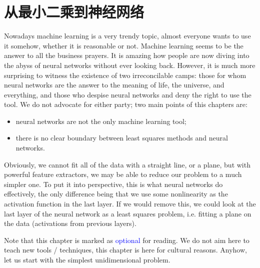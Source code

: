\documentclass[notitlepage,oneside]{book}
\begin{document}
\chapter{从最小二乘到神经网络}

Nowadays machine learning is a very trendy topic, almost everyone wants to use it somehow, whether it is reasonable or not.
Machine learning seems to be the answer to all the business prayers.
It is amazing how people are now diving into the abyss of neural networks without ever looking back.
However, it is much more surprising to witness the existence of two irreconcilable camps: those for whom neural networks are the answer
to the meaning of life, the universe, and everything, and those who despise neural networks and deny the right to use the tool.
We do not advocate for either party; two main points of this chapters are:
\begin{itemize}
\item neural networks are not the only machine learning tool;
\item there is no clear boundary between least squares methods and neural networks.
\end{itemize}

Obviously, we cannot fit all of the data with a straight line, or a plane, but with powerful feature extractors, we may be able to reduce our problem to a much simpler one.
To put it into perspective, this is what neural networks do effectively, the only difference being that we use some nonlinearity as the activation function in the last layer.
If we would remove this, we could look at the last layer of the neural network as a least squares problem, i.e. fitting a plane on the data (activations from previous layers).

Note that this chapter is marked as \textcolor{blue}{optional} for reading.
We do not aim here to teach new tools / techniques, this chapter is here for cultural reasons.
Anyhow, let us start with the simplest unidimensional problem.
\end{document}
